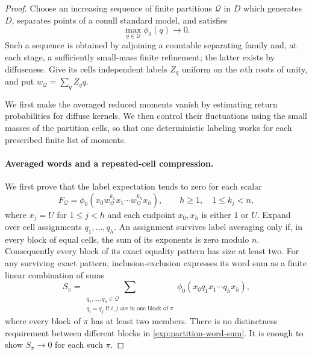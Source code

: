 \begin{proof}
Choose an increasing sequence of finite partitions $\mathcal Q$ in
$D$ which generates $D$, separates points of a conull standard model,
and satisfies
\begin{equation}\label{exp:small-cells}
 \max_{q\in\mathcal Q}\phi_0(q)\longrightarrow0.
\end{equation}
Such a sequence is obtained by adjoining a countable separating family
and, at each stage, a sufficiently small-mass finite refinement; the
latter exists by diffuseness. Give its cells independent labels $Z_q$
uniform on the $n$th roots of unity, and put $w_{\mathcal Q}=\sum_q Z_q q$.

We first make the averaged reduced moments vanish by estimating return
probabilities for diffuse kernels. We then control their fluctuations
using the small masses of the partition cells, so that one deterministic
labeling works for each prescribed finite list of moments.

\paragraph{Averaged words and a repeated-cell compression.}
We first prove that the label expectation tends to zero for each scalar
\begin{equation}\label{exp:reduced-test-word}
 F_{\mathcal Q}
 =\phi_0(x_0 w_{\mathcal Q}^{k_1}x_1\cdots
                 w_{\mathcal Q}^{k_h}x_h),
 \qquad h\geq1,\quad 1\leq k_j<n,
\end{equation}
where $x_j=U$ for $1\leq j<h$ and each endpoint $x_0,x_h$ is either
$1$ or $U$. Expand over cell assignments $q_1,\ldots,q_h$.
An assignment survives label averaging only if, in every block of equal
cells, the sum of its exponents is zero modulo $n$. Consequently every
block of its exact equality pattern has size at least two. For any
surviving exact pattern, inclusion-exclusion expresses its word sum as
a finite linear combination of sums
\begin{equation}\label{exp:partition-word-sum}
 S_\pi
 =\sum_{\substack{q_1,\ldots,q_h\in\mathcal Q\\
                    q_i=q_j\text{ if }i,j\text{ are in one block of }\pi}}
      \phi_0(x_0q_1x_1\cdots q_hx_h),
\end{equation}
where every block of $\pi$ has at least two members. There is no
distinctness requirement between different blocks in
\eqref{exp:partition-word-sum}. It is enough to show $S_\pi\to0$ for
each such $\pi$.


\end{proof}
